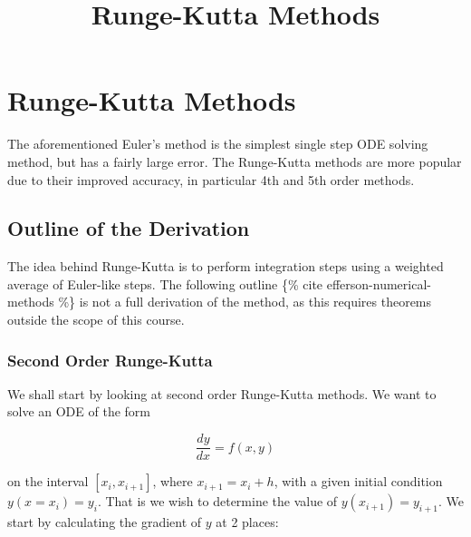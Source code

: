 \documentclass[11pt]{article}
\title{Runge-Kutta Methods}
\date{}
\begin{document}
    
    \maketitle
    
    

    


    \hypertarget{runge-kutta-methods}{%
\section*{Runge-Kutta Methods}\label{runge-kutta-methods}}





    The aforementioned Euler's method is the simplest single step ODE
solving method, but has a fairly large error. The Runge-Kutta methods
are more popular due to their improved accuracy, in particular 4th and
5th order methods.





    \hypertarget{outline-of-the-derivation}{%
\subsection*{Outline of the Derivation}\label{outline-of-the-derivation}}





    The idea behind Runge-Kutta is to perform integration steps using a
weighted average of Euler-like steps. The following outline \{\% cite
efferson-numerical-methods \%\} is not a full derivation of the method,
as this requires theorems outside the scope of this course.





    \hypertarget{second-order-runge-kutta}{%
\subsubsection*{Second Order
Runge-Kutta}\label{second-order-runge-kutta}}





    We shall start by looking at second order Runge-Kutta methods. We want
to solve an ODE of the form

\[
\frac{dy}{dx} = f(x, y)
\]

on the interval \([x_i, x_{i+1}]\), where \(x_{i+1} = x_i + h\), with a
given initial condition \(y(x = x_i) = y_i\). That is we wish to
determine the value of \(y(x_{i+1}) = y_{i+1}\). We start by calculating
the gradient of \(y\) at 2 places:
\end{document}
